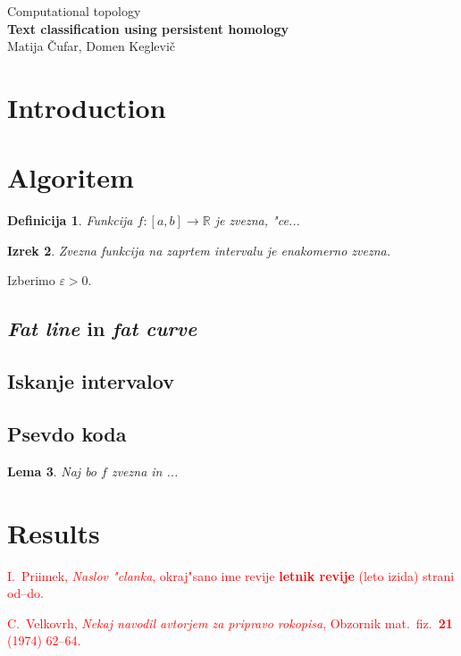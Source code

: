 \documentclass[12pt,a4paper]{amsart}
\newtheorem{definicija}{Definicija}[section]
\newtheorem{lema}[definicija]{Lema}
\newtheorem{izrek}[definicija]{Izrek}
\def\R{\mathbb R}
\begin{document}
\thispagestyle{empty}
\begin{center}{\large
Computational topology\\[4mm]
{\bf Text classification using persistent homology}\\[4mm]
Matija Čufar, Domen Keglevič\\[6mm]
}
\end{center}
\bigskip
\section{Introduction}

\section{Algoritem}

\begin{definicija}
Funkcija $f\colon [a,b]\to\R$ je {\em zvezna}, "ce...
\end{definicija}
%
\begin{izrek}
Zvezna funkcija na zaprtem intervalu je enakomerno zvezna.
\end{izrek}
%
\proof
Izberimo $\varepsilon>0$.
\endproof

\subsection{{\em Fat line} in {\em fat curve}}

\subsection{Iskanje intervalov}

\subsection{Psevdo koda}

\begin{lema}
Naj bo $f$ zvezna in ...
\end{lema}

\section{Results}

\begin{thebibliography}{99}

\textcolor{Red}{I.~Priimek, {\em Naslov "clanka}, okraj"sano ime revije {\bf letnik revije} (leto izida) strani od--do.}

\textcolor{Red}{C.~Velkovrh, {\em Nekaj navodil avtorjem za pripravo rokopisa}, Obzornik mat.\ fiz.\ {\bf 21} (1974) 62--64.}

\end{thebibliography}
\end{document}
